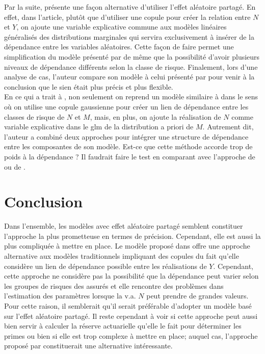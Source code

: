 \documentclass{article}
\begin{document}
	Par la suite, \cite{baumgartner2015bayesian} présente une façon alternative d'utiliser l'effet aléatoire partagé. En effet, dans l'article, plutôt que d'utiliser une copule pour créer la relation entre $N$ et $Y$, on ajoute une variable explicative commune aux modèles linéaires généralisés des distributions marginales qui servira exclusivement à insérer de la dépendance entre les variables aléatoires. Cette façon de faire permet une simplification du modèle présenté par \cite{hernandez2009net} de même que la possibilité d'avoir plusieurs niveaux de dépendance différents selon la classe de risque. Finalement, lors d'une analyse de cas, l'auteur compare son modèle à celui présenté par \cite{kramer2013total} pour venir à la conclusion que le sien était plus précis et plus flexible.\\
	
	En ce qui a trait à \cite{oh2019implementation}, non seulement on reprend un modèle similaire à \cite{hernandez2009net} dans le sens où on utilise une copule gaussienne pour créer un lien de dépendance entre les classes de risque de $N$ et $M$, mais, en plus, on ajoute la réalisation de $N$ comme variable explicative dans le glm de la distribution a priori de $M$. Autrement dit, l'auteur a combiné deux approches pour intégrer une structure de dépendance entre les composantes de son modèle. Est-ce que cette méthode accorde trop de poids à la dépendance ? Il faudrait faire le test en comparant avec l'approche de \cite{hernandez2009net} ou de \cite{baumgartner2015bayesian}.
	
	\section{Conclusion}
	Dans l'ensemble, les modèles avec effet aléatoire partagé semblent constituer l'approche la plus prometteuse en termes de précision. Cependant, elle est aussi la plus compliquée à mettre en place. Le modèle proposé dans \cite{Itre5} offre une approche alternative aux modèles traditionnels impliquant des copules du fait qu'elle considère un lien de dépendance possible entre les réalisations de $Y$. Cependant, cette approche ne considère pas la possibilité que la dépendance peut varier selon les groupes de risques des assurés et elle rencontre des problèmes dans l'estimation des paramètres lorsque la v.a. $N$ peut prendre de grandes valeurs. Pour cette raison, il semblerait qu'il serait préférable d'adopter un modèle basé sur l'effet aléatoire partagé. Il reste cependant à voir si cette approche peut aussi bien servir à calculer la réserve actuarielle qu'elle le fait pour déterminer les primes ou bien si elle est trop complexe à mettre en place; auquel cas, l'approche proposé par \cite{oh2019copula} constituerait une alternative intéressante.
	
	
	\newpage
	
	
\end{document}
